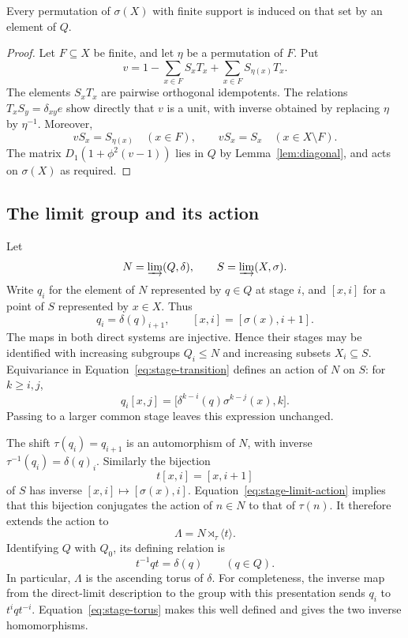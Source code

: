 \begin{lemma}\label{lem:stage-permutations}
Every permutation of $\sigma(X)$ with finite support is induced
on that set by an element of $Q$.
\end{lemma}

\begin{proof}
Let $F\subseteq X$ be finite, and let $\eta$ be a permutation of
$F$.  Put
\[
 v=1-\sum_{x\in F}S_xT_x
      +\sum_{x\in F}S_{\eta(x)}T_x.
\]
The elements $S_xT_x$ are pairwise orthogonal idempotents.  The
relations $T_xS_y=\delta_{xy}e$ show directly that $v$ is a unit,
with inverse obtained by replacing $\eta$ by $\eta^{-1}$.
Moreover,
\[
 vS_x=S_{\eta(x)}\quad(x\in F),
 \qquad vS_x=S_x\quad(x\in X\setminus F).
\]
The matrix $D_1(1+\phi^2(v-1))$ lies in $Q$ by
Lemma~\ref{lem:diagonal}, and acts on $\sigma(X)$ as required.
\end{proof}

\subsection{The limit group and its action}

Let
\[
 N=\varinjlim(Q,\delta),
 \qquad S=\varinjlim(X,\sigma).
\]
Write $q_i$ for the element of $N$ represented by $q\in Q$ at
stage $i$, and $[x,i]$ for a point of $S$ represented by $x\in X$.
Thus
\[
 q_i=\delta(q)_{i+1},
 \qquad [x,i]=[\sigma(x),i+1].
\]
The maps in both direct systems are injective.  Hence their stages
may be identified with increasing subgroups $Q_i\le N$ and
increasing subsets $X_i\subseteq S$.
Equivariance in Equation~\eqref{eq:stage-transition} defines an
action of $N$ on $S$: for $k\ge i,j$,
\begin{equation}\label{eq:stage-limit-action}
 q_i[x,j]=
 \bigl[\delta^{k-i}(q)\sigma^{k-j}(x),k\bigr].
\end{equation}
Passing to a larger common stage leaves this expression unchanged.

The shift $\tau(q_i)=q_{i+1}$ is an automorphism of $N$, with
inverse $\tau^{-1}(q_i)=\delta(q)_i$.  Similarly the bijection
\[
 t[x,i]=[x,i+1]
\]
of $S$ has inverse $[x,i]\mapsto[\sigma(x),i]$.
Equation~\eqref{eq:stage-limit-action} implies that this bijection
conjugates the action of $n\in N$ to that of $\tau(n)$.
It therefore extends the action to
\[
 \Lambda=N\rtimes_{\tau}\langle t\rangle.
\]
Identifying $Q$ with $Q_0$, its defining relation is
\begin{equation}\label{eq:stage-torus}
 t^{-1}qt=\delta(q)\qquad(q\in Q).
\end{equation}
In particular, $\Lambda$ is the ascending torus of $\delta$.
For completeness, the inverse map from the direct-limit description
to the group with this presentation sends $q_i$ to $t^iqt^{-i}$.
Equation~\eqref{eq:stage-torus} makes this well defined and gives
the two inverse homomorphisms.

